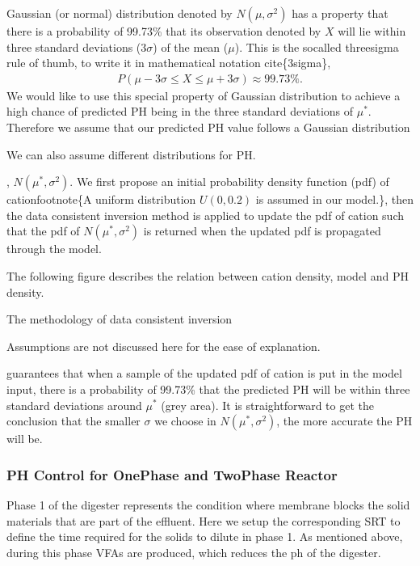 \documentclass[a4paper,10pt,english]{sphinxmanual}
\let\sphinxpxdimen\pdfpxdimen\else\newdimen\sphinxpxdimen
\begin{document}
\sphinxAtStartPar
Gaussian (or normal) distribution denoted by \(N(\mu, \sigma^2)\) has a property that
there is a probability of 99.73\% that its observation denoted by \(X\) will lie within three standard deviations (\(3\sigma\)) of the mean (\(\mu\)). This is the so\sphinxhyphen{}called three\sphinxhyphen{}sigma rule of thumb, to write it in mathematical notation cite\{3sigma\},
\begin{equation*}
\begin{split}P(\mu-3\sigma \leq X \leq \mu+3\sigma) \approx 99.73\%.\end{split}
\end{equation*}
\sphinxAtStartPar
We would like to use this special property of Gaussian distribution to achieve a high chance of predicted PH being in the three standard deviations of \(\mu^*\). Therefore we assume that our predicted PH value follows a Gaussian distribution %
\begin{footnote}[2]\sphinxAtStartFootnote
We can also assume different distributions for PH.
%
\end{footnote}, \(N(\mu^*, \sigma^2)\). We first propose an initial probability  density function (pdf) of cationfootnote\{A uniform distribution \(U(0,0.2)\) is assumed in our model.\}, then the data consistent inversion method is applied to update the pdf  of cation such that the pdf of \(N(\mu^*, \sigma^2)\) is returned when the updated pdf is propagated through the model.

\sphinxAtStartPar
The following figure describes the relation between cation density, model and PH density.

\noindent\sphinxincludegraphics[width=1005\sphinxpxdimen,height=361\sphinxpxdimen]{{pdftonormal}.png}

\sphinxAtStartPar
The methodology of data consistent inversion %
\begin{footnote}[3]\sphinxAtStartFootnote
Assumptions are not discussed here for the ease of explanation.
%
\end{footnote} guarantees that when a sample of the updated pdf of cation is put in the model input, there is a probability of 99.73\% that the predicted PH will be within three standard deviations around \(\mu^*\) (grey area). It is straightforward to get the conclusion  that the smaller \(\sigma\) we choose in \(N(\mu^*, \sigma^2)\), the more accurate the PH will be.


\subsubsection{PH Control for One\sphinxhyphen{}Phase and Two\sphinxhyphen{}Phase Reactor}
\label{\detokenize{jupyter_notebook/ph12:ph-control-for-one-phase-and-two-phase-reactor}}\label{\detokenize{jupyter_notebook/ph12::doc}}
\sphinxAtStartPar
Phase 1 of the digester represents the condition where membrane blocks the solid materials that are part of the effluent. Here we setup the corresponding SRT to define the time required for the solids to dilute in phase 1. As mentioned above, during this phase VFAs are produced, which reduces the ph of the digester.
\end{document}

